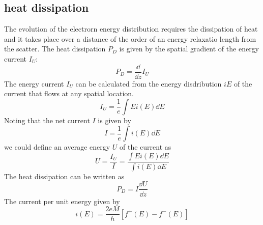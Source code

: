 \documentclass[11pt,a4paper]{book}
\theoremstyle{plain}
\theoremstyle{definition}
\theoremstyle{remark}
\begin{document}
\subsection{heat dissipation}
The evolution of the electrorn energy distribution requires the dissipation of heat and it takes place over a distance of the order of an energy relaxatio length from the scatter. The heat dissipation $P_D$ is given by the spatial gradient of the energy current $I_U$:
\begin{equation}
    P_D = \frac{\dd}{\dd z} I_{U}
\end{equation}
The energy current $I_U$ can be calculated from the energy disdribution $i{E}$ of the current that flows at any spatial location.
\begin{equation}
    I_U = \frac{1}{e} \int E i(E) \dd E
\end{equation}
Noting that the net current $I$ is given by
\begin{equation}
    I = \frac{1}{e} \int i(E) \dd E
\end{equation}
we could define an average energy $U$ of the current as
\begin{equation}
    U = \frac{I_U}{I} = \frac{\int E i(E) \dd E}{\int i(E) \dd E}
\end{equation}
The heat dissipation can be written as
\begin{equation}
    P_D = I \frac{\dd U}{\dd z}
\end{equation}
The current per unit energy given by
\begin{equation}
    i(E) = \frac{2 e M}{h}\left[f^+(E) - f^-(E)\right]
\end{equation}
\end{document}
